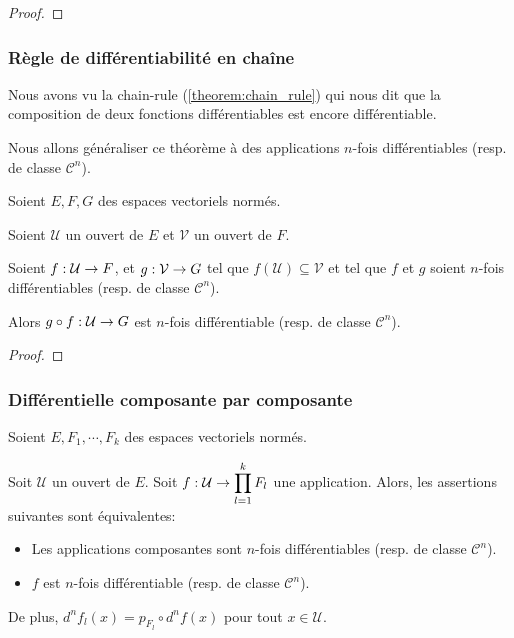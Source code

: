 \begin{proof}

\end{proof}

\subsubsection{Règle de différentiabilité en chaîne}

Nous avons vu la chain-rule (\ref{theorem:chain_rule}) qui nous dit que la
composition de deux fonctions différentiables est encore différentiable.

Nous allons généraliser ce théorème à des applications $n$-fois différentiables
(resp. de classe $\mathcal{C}^{n}$).

\begin{proposition}
	Soient $E, F, G$ des espaces vectoriels normés.

	Soient $\mathcal{U}$ un ouvert de $E$ et $\mathcal{V}$ un ouvert de $F$.

	Soient $f : \mathcal{U} \rightarrow F$, et $g : \mathcal{V} \rightarrow G$
	tel que $f(\mathcal{U}) \subseteq \mathcal{V}$ et tel que $f$ et $g$ soient
	$n$-fois différentiables (resp. de classe $\mathcal{C}^{n}$).

	Alors $g \circ f : \mathcal{U} \rightarrow G$ est $n$-fois différentiable
	(resp. de classe $\mathcal{C}^{n}$).
\end{proposition}

\begin{proof}

\end{proof}

\subsubsection{Différentielle composante par composante}

Soient $E, F_{1}, \cdots, F_{k}$ des espaces vectoriels normés.

\begin{proposition}
	Soit $\mathcal{U}$ un ouvert de $E$.
	Soit $f : \mathcal{U} \rightarrow \displaystyle \prod_{l = 1}^{k} F_{l}$ une
	application.
	Alors, les assertions suivantes sont équivalentes:

	\begin{itemize}
		\item Les applications composantes sont $n$-fois différentiables (resp.
			de classe $\mathcal{C}^{n}$).
		\item $f$ est $n$-fois différentiable (resp. de classe
			$\mathcal{C}^{n}$).
	\end{itemize}

	De plus, $d^{n}f_{l}(x) = p_{F_{l}} \circ d^{n} f(x)$ pour tout $x \in
	\mathcal{U}$.
\end{proposition}

